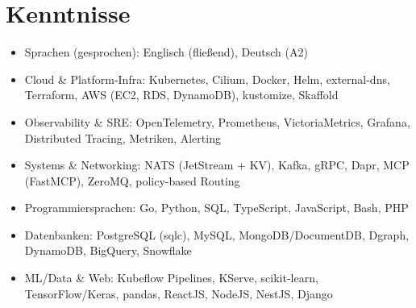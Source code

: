 \documentclass[10pt,a4paper]{resume}
\begin{document}
\section{Kenntnisse}

\begin{itemize}[leftmargin=1.4em,nosep,topsep=2pt]
  \item Sprachen (gesprochen): Englisch (fließend), Deutsch (A2)
  \item Cloud \& Platform-Infra: Kubernetes, Cilium, Docker, Helm, external-dns, Terraform, AWS (EC2, RDS, DynamoDB), kustomize, Skaffold
  \item Observability \& SRE: OpenTelemetry, Prometheus, VictoriaMetrics, Grafana, Distributed Tracing, Metriken, Alerting
  \item Systems \& Networking: NATS (JetStream + KV), Kafka, gRPC, Dapr, MCP (FastMCP), ZeroMQ, policy-based Routing
  \item Programmiersprachen: Go, Python, SQL, TypeScript, JavaScript, Bash, PHP
  \item Datenbanken: PostgreSQL (sqlc), MySQL, MongoDB/DocumentDB, Dgraph, DynamoDB, BigQuery, Snowflake
  \item ML/Data \& Web: Kubeflow Pipelines, KServe, scikit-learn, TensorFlow/Keras, pandas, ReactJS, NodeJS, NestJS, Django
\end{itemize}
\end{document}
